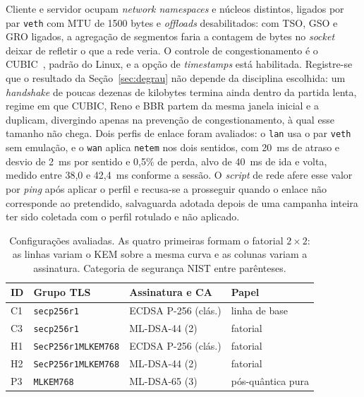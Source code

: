 \documentclass[conference]{IEEEtran}
\begin{document}
Cliente e servidor ocupam \textit{network namespaces} e núcleos distintos,
ligados por par \texttt{veth} com MTU de 1500 bytes e \textit{offloads}
desabilitados: com TSO, GSO e GRO ligados, a agregação de segmentos faria a
contagem de bytes no \textit{socket} deixar de refletir o que a rede veria. O
controle de congestionamento é o CUBIC~\cite{ha2008cubic}, padrão do Linux, e a
opção de \textit{timestamps} está habilitada. Registre-se que o resultado da
Seção~\ref{sec:degrau} não depende da disciplina escolhida: um \textit{handshake}
de poucas dezenas de kilobytes termina ainda dentro da partida lenta, regime em
que CUBIC, Reno e BBR partem da mesma janela inicial e a duplicam, divergindo
apenas na prevenção de congestionamento, à qual esse tamanho não chega. Dois
perfis de enlace foram avaliados: o \texttt{lan} usa o par \texttt{veth} sem
emulação, e o \texttt{wan} aplica \texttt{netem} nos dois sentidos, com 20~ms de
atraso e desvio de 2~ms por sentido e 0,5\% de perda, alvo de 40~ms de ida e
volta, medido entre 38,0 e 42,4~ms conforme a sessão. O \textit{script} de rede
afere esse valor por \textit{ping} após aplicar o perfil e recusa-se a prosseguir
quando o enlace não corresponde ao pretendido, salvaguarda adotada depois de uma
campanha inteira ter sido coletada com o perfil rotulado e não aplicado.

\begin{table}[!t]
\caption{Configurações avaliadas. As quatro primeiras formam o fatorial
$2\times2$: as linhas variam o KEM sobre a mesma curva e as colunas variam a
assinatura. Categoria de segurança NIST entre parênteses.}
\label{tab:tratamentos}
\centering
\footnotesize
\setlength{\tabcolsep}{4pt}
\begin{tabular}{@{}llll@{}}
\toprule
\textbf{ID} & \textbf{Grupo TLS} & \textbf{Assinatura e CA} & \textbf{Papel} \\
\midrule
C1 & \texttt{secp256r1}         & ECDSA P-256 (clás.) & linha de base \\
C3 & \texttt{secp256r1}         & ML-DSA-44 (2)       & fatorial \\
H1 & \texttt{SecP256r1MLKEM768} & ECDSA P-256 (clás.) & fatorial \\
H2 & \texttt{SecP256r1MLKEM768} & ML-DSA-44 (2)       & fatorial \\
P3 & \texttt{MLKEM768}          & ML-DSA-65 (3)       & pós-quântica pura \\
\bottomrule
\end{tabular}
\end{table}
\end{document}
